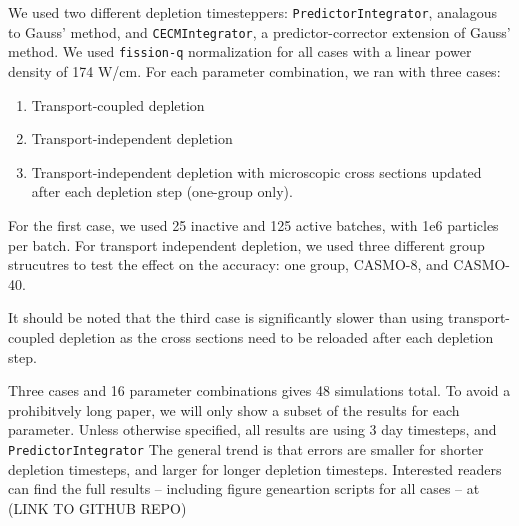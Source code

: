     We used two different depletion timesteppers: \verb.PredictorIntegrator.,
    analagous to Gauss' method, and \verb.CECMIntegrator., a predictor-corrector
    extension of Gauss' method.
    We used \verb.fission-q. normalization for all cases with a linear power
    density of 174 W/cm.
    For each parameter combination, we ran with three cases:
    \begin{enumerate}
        \item Transport-coupled depletion
        \item Transport-independent depletion
        \item Transport-independent depletion with microscopic cross sections
            updated after each depletion step (one-group only).
    \end{enumerate}

    For the first case, we used 25 inactive and 125 active batches, with 1e6
    particles per batch. 
    For transport independent depletion, we used three different group
    strucutres to test the effect on the accuracy: one group, CASMO-8, and
    CASMO-40.

    It should be noted that the third case is significantly slower than using
    transport-coupled depletion as the cross sections need to be reloaded after
    each depletion step. 

    Three cases and 16 parameter combinations gives 48 simulations total.
    To avoid a prohibitvely long paper, we will only show a subset of the
    results for each parameter. Unless otherwise specified, all results are
    using 3 day timesteps, and \verb.PredictorIntegrator.  The general trend is
    that errors are smaller for
    shorter depletion timesteps, and larger for longer depletion timesteps.
    Interested readers can find the full results -- including figure geneartion
    scripts for all cases -- at (LINK TO GITHUB REPO)



